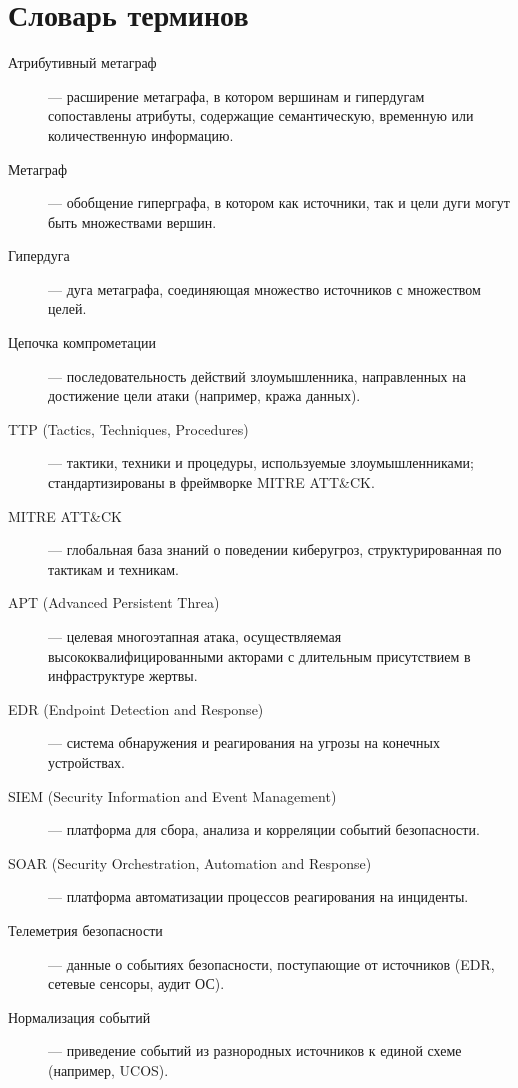 
\chapter*{Словарь терминов}             %

\begin{description}
    \item[Атрибутивный метаграф] — расширение метаграфа, в котором вершинам и гипердугам сопоставлены атрибуты, содержащие семантическую, временную или количественную информацию.
    \item[Метаграф] — обобщение гиперграфа, в котором как источники, так и цели дуги могут быть множествами вершин.
    \item[Гипердуга] — дуга метаграфа, соединяющая множество источников с множеством целей.
    \item[Цепочка компрометации] — последовательность действий злоумышленника, направленных на достижение цели атаки (например, кража данных).
    \item[TTP (Tactics, Techniques, Procedures)] — тактики, техники и процедуры, используемые злоумышленниками; стандартизированы в фреймворке MITRE ATT\&CK.
    \item[MITRE ATT\&CK] — глобальная база знаний о поведении киберугроз, структурированная по тактикам и техникам.
    \item[APT (Advanced Persistent Threa)] — целевая многоэтапная атака, осуществляемая высококвалифицированными акторами с длительным присутствием в инфраструктуре жертвы.
    \item[EDR (Endpoint Detection and Response)] — система обнаружения и реагирования на угрозы на конечных устройствах.
    \item[SIEM (Security Information and Event Management)] — платформа для сбора, анализа и корреляции событий безопасности.
    \item[SOAR (Security Orchestration, Automation and Response)] — платформа автоматизации процессов реагирования на инциденты.
    \item[Телеметрия безопасности] — данные о событиях безопасности, поступающие от источников (EDR, сетевые сенсоры, аудит ОС).
    \item[Нормализация событий] — приведение событий из разнородных источников к единой схеме (например, UCOS).

\end{description}
